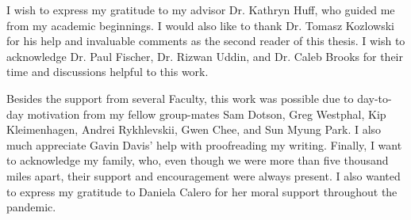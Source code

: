 
I wish to express my gratitude to my advisor Dr. Kathryn Huff, who guided me from my academic beginnings.
I would also like to thank Dr. Tomasz Kozlowski for his help and invaluable comments as the second reader of this thesis.
I wish to acknowledge Dr. Paul Fischer, Dr. Rizwan Uddin, and Dr. Caleb Brooks for their time and discussions helpful to this work.

Besides the support from several Faculty, this work was possible due to day-to-day motivation from my fellow group-mates Sam Dotson, Greg Westphal, Kip Kleimenhagen, Andrei Rykhlevskii, Gwen Chee, and Sun Myung Park.
I also much appreciate Gavin Davis' help with proofreading my writing.
Finally, I want to acknowledge my family, who, even though we were more than five thousand miles apart, their support and encouragement were always present.
I also wanted to express my gratitude to Daniela Calero for her moral support throughout the pandemic.
